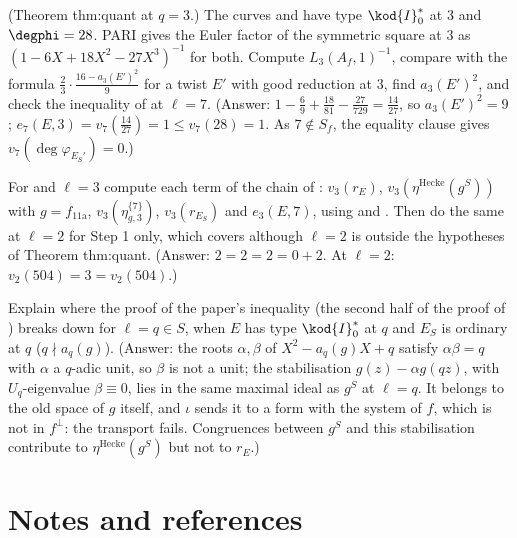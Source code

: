 \begin{exercise}\label{ex:congruence:ex-q3}
(Theorem thm:quant at $q=3$.) The curves  and  have type $\kod{I}_0^*$ at $3$ and $\degphi=28$. PARI gives the Euler factor of the symmetric square at $3$ as $(1-6X+18X^2-27X^3)^{-1}$ for both.
Compute $L_3(A_f,1)^{-1}$, compare with the formula $\frac23\cdot\frac{16-a_3(E')^2}9$ for a twist $E'$ with good reduction at $3$, find $a_3(E')^2$, and check the inequality of  at $\ell=7$.
(Answer: $1-\frac69+\frac{18}{81}-\frac{27}{729}=\frac{14}{27}$, so $a_3(E')^2=9$; $e_7(E,3)=v_7(\frac{14}{27})=1\le v_7(28)=1$. As $7\notin S_f$, the equality clause gives $v_7(\deg\varphi_{E_S'})=0$.)
\end{exercise}

\begin{exercise}\label{ex:congruence:ex-chain}
For  and $\ell=3$ compute each term of the chain of : $v_3(r_E)$, $v_3(\eta^{\mathrm{Hecke}}(g^S))$ with $g=f_{\text{11a}}$, $v_3(\eta^{\{7\}}_{g,3})$, $v_3(r_{E_S})$ and $e_3(E,7)$, using
 and . Then do the same at $\ell=2$ for Step 1 only, which  covers although $\ell=2$ is outside the hypotheses of Theorem thm:quant.
(Answer: $2=2=2=0+2$. At $\ell=2$: $v_2(504)=3=v_2(504)$.)
\end{exercise}

\begin{exercise}\label{ex:congruence:ex-step1-prime}
Explain where the proof of the paper's inequality (the second half of the proof of ) breaks down for $\ell=q\in S$, when $E$ has type $\kod{I}_0^*$ at $q$ and $E_S$ is ordinary at $q$
($q\nmid a_q(g)$). (Answer: the roots $\alpha,\beta$ of $X^2-a_q(g)X+q$ satisfy $\alpha\beta=q$ with $\alpha$ a $q$-adic unit, so $\beta$ is not a unit; the stabilisation $g(z)-\alpha g(qz)$, with $U_q$-eigenvalue $\beta\equiv0$, lies in the same
maximal ideal as $g^S$ at $\ell=q$. It belongs to the old space of $g$ itself, and $\iota$ sends it to a form with the system of $f$, which is not in $f^\perp$: the transport fails. Congruences between
$g^S$ and this stabilisation contribute to $\eta^{\mathrm{Hecke}}(g^S)$ but not to $r_E$.)
\end{exercise}

\section{Notes and references}\label{sec:congruence:notes}

